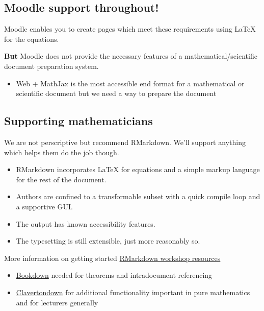 \documentclass[
  12pt,
  a4paper]{extarticle}
\providecommand{\tightlist}{%
  \setlength{\itemsep}{0pt}\setlength{\parskip}{0pt}}
\renewcommand{\;}{\,}
\begin{document}
\hypertarget{moodle-support-throughout}{%
\subsection{Moodle support throughout!}\label{moodle-support-throughout}}

Moodle enables you to create pages which meet these requirements using LaTeX for the equations.

\textbf{But} Moodle does not provide the necessary features of a mathematical/scientific document preparation system.

\begin{itemize}
\tightlist
\item
  Web + MathJax is the most accessible end format for a mathematical or scientific document but we need a way to prepare the document
\end{itemize}

\hypertarget{supporting-mathematicians}{%
\subsection{Supporting mathematicians}\label{supporting-mathematicians}}

We are not perscriptive but recommend RMarkdown. We'll support anything which helps them do the job though.

\begin{itemize}
\tightlist
\item
  RMarkdown incorporates LaTeX for equations and a simple markup language for the rest of the document.
\item
  Authors are confined to a transformable subset with a quick compile loop and a supportive GUI.
\item
  The output has known accessibility features.
\item
  The typesetting is still extensible, just more reasonably so.
\end{itemize}

More information on getting started \href{https://stem-enable.github.io/RMarkdownWorkshop/}{RMarkdown workshop resources}

\begin{itemize}
\tightlist
\item
  \href{https://bookdown.org/}{Bookdown} needed for theorems and intradocument referencing
\item
  \href{https://bathmash.github.io/clavertondown/}{Clavertondown} for additional functionality important in pure mathematics and for lecturers generally
\end{itemize}
\end{document}
